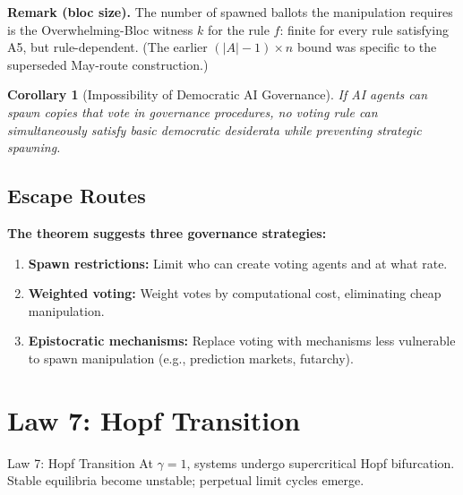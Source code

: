 \documentclass[12pt]{article}
\newtheorem{corollary}[theorem]{Corollary}
\newcommand{\added}[1]{\textbf{#1}}
\begin{document}
\noindent\added{\textbf{Remark (bloc size).}} The number of spawned ballots the manipulation requires is the Overwhelming-Bloc witness $k$ for the rule $f$: finite for every rule satisfying A5, but rule-dependent. (The earlier $(|A|-1)\times n$ bound was specific to the superseded May-route construction.)

\begin{corollary}[Impossibility of Democratic AI Governance]
\label{cor:democratic-ai}
If AI agents can spawn copies that vote in governance procedures, no voting rule can simultaneously satisfy basic democratic desiderata while preventing strategic spawning.
\end{corollary}

\subsection{Escape Routes}

\added{\textbf{The theorem suggests three governance strategies:}}
\begin{enumerate}
    \item \textbf{Spawn restrictions:} Limit who can create voting agents and at what rate.
    \item \textbf{Weighted voting:} Weight votes by computational cost, eliminating cheap manipulation.
    \item \textbf{Epistocratic mechanisms:} Replace voting with mechanisms less vulnerable to spawn manipulation (e.g., prediction markets, futarchy).
\end{enumerate}




\section{Law 7: Hopf Transition}
\label{sec:law7}

\begin{lawbox}{Law 7: Hopf Transition}
At $\gamma = 1$, systems undergo supercritical Hopf bifurcation. Stable equilibria become unstable; perpetual limit cycles emerge.
\end{lawbox}
\end{document}
